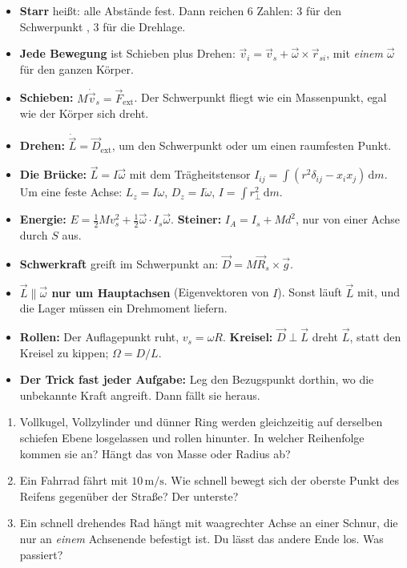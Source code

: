 \documentclass[deutsch]{kaelearn}
\newcommand\dd{\mathrm{d}}
\newcommand\ext{_{\mathrm{ext}}}
\begin{document}
\begin{twominute}
\begin{itemize}
  \item \textbf{Starr} heißt: alle Abstände fest. Dann reichen 6 Zahlen: 3 für den Schwerpunkt , 3 für die Drehlage.
  \item \textbf{Jede Bewegung} ist Schieben plus Drehen: $\vec v_i = \vec v_s + \vec\omega\times\vec r_{si}$, mit \emph{einem} $\vec\omega$ für den ganzen Körper.
  \item \textbf{Schieben:} $M\dot{\vec v}_s = \vec F\ext$. Der Schwerpunkt fliegt wie ein Massenpunkt, egal wie der Körper sich dreht.
  \item \textbf{Drehen:} $\dot{\vec L} = \vec D\ext$, um den Schwerpunkt oder um einen raumfesten Punkt.
  \item \textbf{Die Brücke:} $\vec L = I\vec\omega$ mit dem Trägheitstensor $I_{ij} = \int(r^2\delta_{ij}-x_ix_j)\,\dd m$.
        Um eine feste Achse: $L_z = I\omega$, $D_z = I\dot\omega$, $I = \int r_\perp^2\,\dd m$.
  \item \textbf{Energie:} $E = \frac12Mv_s^2 + \frac12\vec\omega\cdot I_s\vec\omega$. \textbf{Steiner:} $I_A = I_s + Md^2$, nur von einer Achse durch $S$ aus.
  \item \textbf{Schwerkraft} greift im Schwerpunkt an: $\vec D = M\vec R_s\times\vec g$.
  \item \textbf{$\vec L\parallel\vec\omega$ nur um Hauptachsen} (Eigenvektoren von $I$). Sonst läuft $\vec L$ mit, und die Lager müssen ein Drehmoment liefern.
  \item \textbf{Rollen:} Der Auflagepunkt ruht, $v_s = \omega R$. \textbf{Kreisel:} $\vec D\perp\vec L$ dreht $\vec L$, statt den Kreisel zu kippen; $\Omega = D/L$.
  \item \textbf{Der Trick fast jeder Aufgabe:} Leg den Bezugspunkt dorthin, wo die unbekannte Kraft angreift. Dann fällt sie heraus.
\end{itemize}
\end{twominute}

\begin{guessfirst}
\begin{enumerate}
  \item Vollkugel, Vollzylinder und dünner Ring werden gleichzeitig auf derselben schiefen Ebene losgelassen und rollen hinunter.
        In welcher Reihenfolge kommen sie an? Hängt das von Masse oder Radius ab?
  \item Ein Fahrrad fährt mit $10\,\mathrm{m/s}$. Wie schnell bewegt sich der oberste Punkt des Reifens gegenüber der Straße? Der unterste?
  \item Ein schnell drehendes Rad hängt mit waagrechter Achse an einer Schnur, die nur an \emph{einem} Achsenende befestigt ist. Du
        lässt das andere Ende los. Was passiert?
\end{enumerate}
\end{guessfirst}
\end{document}
